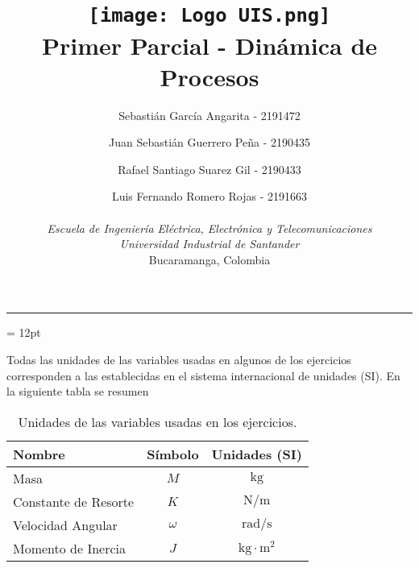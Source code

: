 \documentclass[letterpaper, 12pt]{article}
\title{\protect\vspace{-0.5cm}\protect\texttt{[image: Logo UIS.png]} \\
Primer Parcial - Dinámica de Procesos}
\author{Sebastián García Angarita - 2191472\and
        Juan Sebastián Guerrero Peña - 2190435\and
        Rafael Santiago Suarez Gil - 2190433\and
        Luis Fernando Romero Rojas - 2191663 \\ \\
        \textit{Escuela de Ingeniería Eléctrica, Electrónica y Telecomunicaciones} \\
        \textit{Universidad Industrial de Santander}\\
        Bucaramanga, Colombia \\}
\date{}
\begin{document}
\maketitle
\begin{center}\rule{0.9\linewidth}{0.5pt}\end{center}
\parskip = 12pt

Todas las unidades de las variables usadas en algunos de los ejercicios corresponden a las establecidas en el sistema internacional de unidades (SI). En la siguiente tabla se resumen

\begin{table}[H]
\centering
\begin{tabular}{l|c|c}
    \hline
    Nombre \hspace{3cm} & Símbolo & Unidades (SI) \\
    \hline
    Masa & $M$ & $\mathrm{kg}$ \\
    Constante de Resorte & $K$ & $\mathrm{N/m}$ \\
    Velocidad Angular & $\omega$ & $\mathrm{rad/s}$ \\
    Momento de Inercia & $J$ & $\mathrm{kg\cdot m^2}$ \\
    
\end{tabular}
\caption{Unidades de las variables usadas en los ejercicios.}
\label{tab:my_label}
\end{table}
\end{document}

